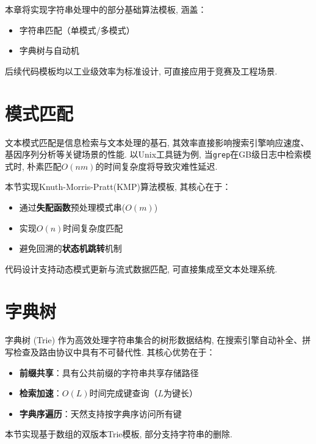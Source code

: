 \documentclass[a4paper]{ctexbook}
\begin{document}
本章将实现字符串处理中的部分基础算法模板, 涵盖：
\begin{itemize}
    \item 字符串匹配（单模式/多模式）
    \item 字典树与自动机
\end{itemize}

后续代码模板均以工业级效率为标准设计, 可直接应用于竞赛及工程场景. 

\section{模式匹配}

文本模式匹配是信息检索与文本处理的基石, 其效率直接影响搜索引擎响应速度、基因序列分析等关键场景的性能. 以Unix工具链为例, 当\texttt{grep}在GB级日志中检索模式时, 朴素匹配$O(nm)$的时间复杂度将导致灾难性延迟. 

本节实现Knuth-Morris-Pratt(KMP)算法模板, 其核心在于：
\begin{itemize}
    \item 通过\textbf{失配函数}预处理模式串($O(m)$)
    \item 实现$O(n)$时间复杂度匹配
    \item 避免回溯的\textbf{状态机跳转}机制
\end{itemize}
代码设计支持动态模式更新与流式数据匹配, 可直接集成至文本处理系统. 



\section{字典树}


字典树 (Trie) 作为高效处理字符串集合的树形数据结构, 在搜索引擎自动补全、拼写检查及路由协议中具有不可替代性. 其核心优势在于：
\begin{itemize}
    \item \textbf{前缀共享}：具有公共前缀的字符串共享存储路径
    \item \textbf{检索加速}：$O(L)$时间完成键查询（$L$为键长）
    \item \textbf{字典序遍历}：天然支持按字典序访问所有键
\end{itemize}

本节实现基于数组的双版本Trie模板, 部分支持字符串的删除.


\end{document}
